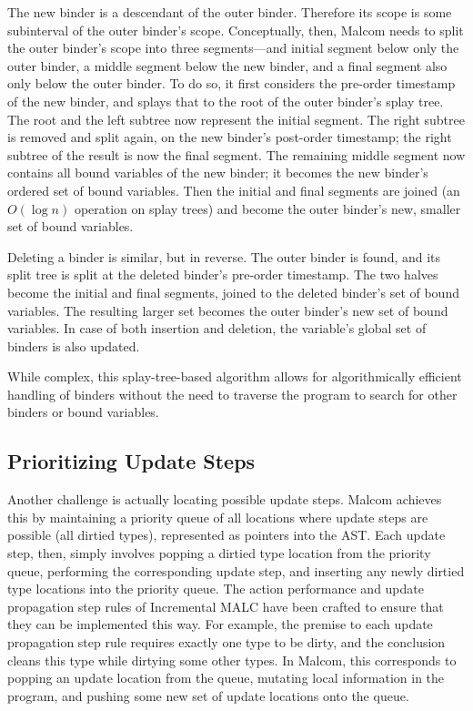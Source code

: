 The new binder is a descendant of the outer binder. Therefore its scope is some subinterval of the outer binder's scope. Conceptually, then, Malcom needs to split the outer binder's scope into three segments---and initial segment below only the outer binder, a middle segment below the new binder, and a final segment also only below the outer binder. To do so, it first considers the pre-order timestamp of the new binder, and splays that to the root of the outer binder's splay tree. The root and the left subtree now represent the initial segment. The right subtree is removed and split again, on the new binder's post-order timestamp; the right subtree of the result is now the final segment. The remaining middle segment now contains all bound variables of the new binder; it becomes the new binder's ordered set of bound variables. Then the initial and final segments are joined (an $O(\log n)$ operation on splay trees) and become the outer binder's new, smaller set of bound variables. %

Deleting a binder is similar, but in reverse. The outer binder is found, and its split tree is split at the deleted binder's pre-order timestamp. The two halves become the initial and final segments, joined to the deleted binder's set of bound variables. The resulting larger set becomes the outer binder's new set of bound variables. In case of both insertion and deletion, the variable's global set of binders is also updated.

While complex, this splay-tree-based algorithm allows for algorithmically efficient handling of binders without the need to traverse the program to search for other binders or bound variables.

\subsection{Prioritizing Update Steps}
\label{subsec:Update Priority Queue}

Another challenge is actually locating possible update steps.
Malcom achieves this by maintaining a priority queue of all locations where update steps are possible (all dirtied types), represented as pointers into the AST. Each update step, then, simply involves popping a dirtied type location from the priority queue, performing the corresponding update step, and inserting any newly dirtied type locations into the priority queue. The action performance and update propagation step rules of Incremental MALC have been crafted to ensure that they can be implemented this way. For example, the premise to each update propagation step rule requires exactly one type to be dirty, and the conclusion cleans this type while dirtying some other types. In Malcom, this corresponds to popping an update location from the queue, mutating local information in the program, and pushing some new set of update locations onto the queue. 

